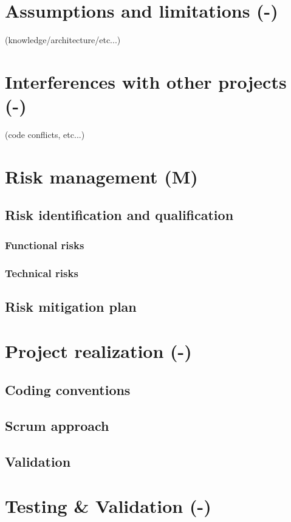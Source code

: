 \documentclass[a4paper,12pt,abstracton,titlepage]{scrartcl}
\begin{document}
\section{Assumptions and limitations (-)}
\label{sec:assumptions-limitations}
(knowledge/architecture/etc...)

\section{Interferences with other projects (-)}
\label{sec:interferences}
(code conflicts, etc...)

\section{Risk management (M)}
\label{sec:risk-management}
\subsection{Risk identification and qualification}
\subsubsection{Functional risks}
\lipsum[1]
\subsubsection{Technical risks}
\lipsum[1]
\subsection{Risk mitigation plan}
\lipsum[1]

\section{Project realization (-)}
\label{sec:project-realization}
\subsection{Coding conventions}
\lipsum[1]
\subsection{Scrum approach}
\lipsum[1]
\subsection{Validation}
\lipsum[1]

\section{Testing \& Validation (-)}
\label{sec:testing-validation}
\end{document}
